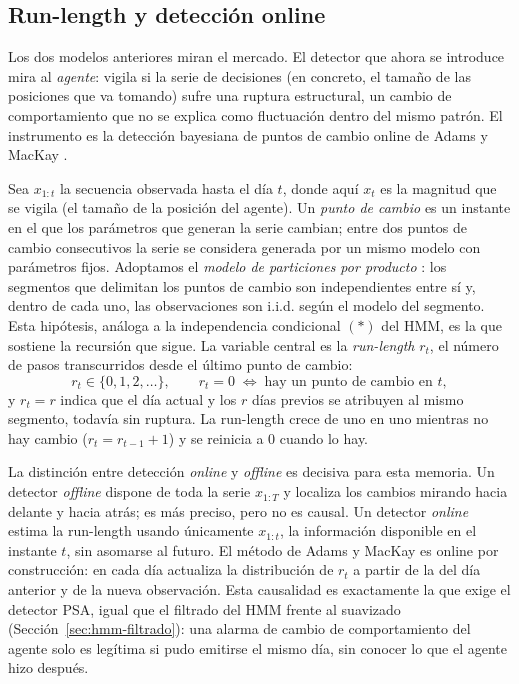 \subsection{Run-length y detección online}
\label{sec:bocpd-runlength}

Los dos modelos anteriores miran el mercado. El detector que ahora se introduce mira al \emph{agente}: vigila si la serie de decisiones (en concreto, el tamaño de las posiciones que va tomando) sufre una ruptura estructural, un cambio de comportamiento que no se explica como fluctuación dentro del mismo patrón. El instrumento es la detección bayesiana de puntos de cambio online de Adams y MacKay \cite{adams2007}.

Sea $x_{1:t}$ la secuencia observada hasta el día $t$, donde aquí $x_t$ es la magnitud que se vigila (el tamaño de la posición del agente). Un \emph{punto de cambio} es un instante en el que los parámetros que generan la serie cambian; entre dos puntos de cambio consecutivos la serie se considera generada por un mismo modelo con parámetros fijos. Adoptamos el \emph{modelo de particiones por producto} \cite{adams2007}: los segmentos que delimitan los puntos de cambio son independientes entre sí y, dentro de cada uno, las observaciones son i.i.d. según el modelo del segmento. Esta hipótesis, análoga a la independencia condicional $(\ast)$ del HMM, es la que sostiene la recursión que sigue. La variable central es la \emph{run-length} $r_t$, el número de pasos transcurridos desde el último punto de cambio:
\[
r_t \in \{0, 1, 2, \dots\}, \qquad
r_t = 0 \;\Leftrightarrow\; \text{hay un punto de cambio en } t,
\]
y $r_t = r$ indica que el día actual y los $r$ días previos se atribuyen al mismo segmento, todavía sin ruptura. La run-length crece de uno en uno mientras no hay cambio ($r_t = r_{t-1} + 1$) y se reinicia a $0$ cuando lo hay.

La distinción entre detección \emph{online} y \emph{offline} es decisiva para esta memoria. Un detector \emph{offline} dispone de toda la serie $x_{1:T}$ y localiza los cambios mirando hacia delante y hacia atrás; es más preciso, pero no es causal. Un detector \emph{online} estima la run-length usando únicamente $x_{1:t}$, la información disponible en el instante $t$, sin asomarse al futuro. El método de Adams y MacKay es online por construcción: en cada día actualiza la distribución de $r_t$ a partir de la del día anterior y de la nueva observación. Esta causalidad es exactamente la que exige el detector PSA, igual que el filtrado del HMM frente al suavizado (Sección~\ref{sec:hmm-filtrado}): una alarma de cambio de comportamiento del agente solo es legítima si pudo emitirse el mismo día, sin conocer lo que el agente hizo después.


